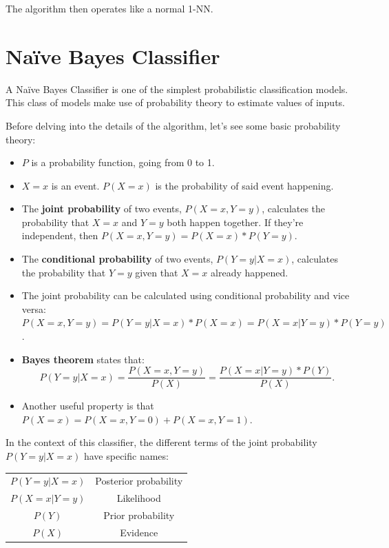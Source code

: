 The algorithm then operates like a normal 1-NN.

\section{Naïve Bayes Classifier}

A Naïve Bayes Classifier is one of the simplest probabilistic classification models. This class of models make use of probability theory to estimate values of inputs.

Before delving into the details of the algorithm, let's see some basic probability theory:

\begin{itemize}
    \item $P$ is a probability function, going from 0 to 1.
    \item $X=x$ is an event. $P(X=x)$ is the probability of said event happening.
    \item The \textbf{joint probability} of two events, $P(X=x, Y=y)$, calculates the probability that $X=x$ and $Y=y$ both happen together. If they're independent, then $P(X=x, Y=y) = P(X=x) * P(Y=y)$.
    \item The \textbf{conditional probability} of two events, $P(Y=y|X=x)$, calculates the probability that $Y=y$ given that $X=x$ already happened.
    \item The joint probability can be calculated using conditional probability and vice versa: $P(X=x,Y=y) = P(Y=y|X=x) * P(X=x) = P(X=x|Y=y) * P(Y=y)$.
    \item \textbf{Bayes theorem} states that:
    \begin{equation*}
    P(Y=y|X=x) = \dfrac{P(X=x,Y=y)}{P(X)} = \dfrac{P(X=x|Y=y) * P(Y)}{P(X)}.
    \end{equation*}
    \item Another useful property is that $P(X=x) = P(X=x, Y=0) + P(X=x, Y=1)$.
\end{itemize}

In the context of this classifier, the different terms of the joint probability $P(Y=y|X=x)$ have specific names:

\begin{table}[ht]
    \centering
    \begin{tabular}{c|c}
        $P(Y=y|X=x)$ & Posterior probability\\
        $P(X=x|Y=y)$ & Likelihood \\
        $P(Y)$ & Prior probability \\
        $P(X)$ & Evidence \\
    \end{tabular}
\end{table}

